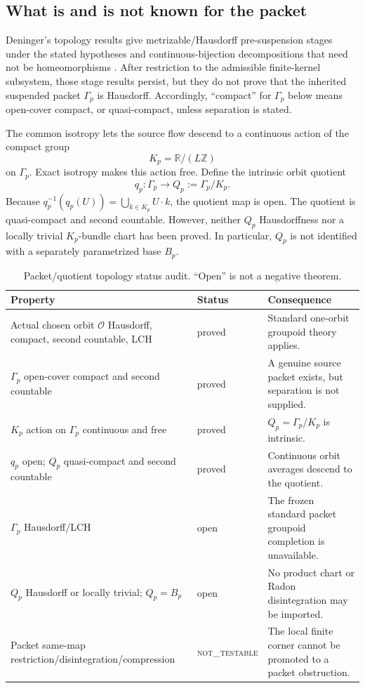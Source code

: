 \documentclass[11pt]{article}
\theoremstyle{definition}
\newcommand{\R}{\mathbb{R}}
\newcommand{\Z}{\mathbb{Z}}
\newcommand{\NOTTESTABLE}{\textsc{not\_testable}}
\begin{document}
\subsection{What is and is not known for the packet}

Deninger's topology results give metrizable/Hausdorff pre-suspension stages under the stated hypotheses and continuous-bijection decompositions that need not be homeomorphisms \cite[Propositions~7.4, 7.6, and~7.7; Corollaries~7.8--7.9; Theorem~7.10 and remarks, arXiv-v4 pp.~43--47]{Deninger2026}.  After restriction to the admissible finite-kernel subsystem, those stage results persist, but they do not prove that the inherited suspended packet \(\Gamma_p\) is Hausdorff.  Accordingly, ``compact'' for \(\Gamma_p\) below means open-cover compact, or quasi-compact, unless separation is stated.

The common isotropy lets the source flow descend to a continuous action of the compact group
\[
 K_p=\R/(L\Z)
\]
on \(\Gamma_p\).  Exact isotropy makes this action free.  Define the intrinsic orbit quotient
\[
 q_p:\Gamma_p\longrightarrow Q_p:=\Gamma_p/K_p.
\]
Because \(q_p^{-1}(q_p(U))=\bigcup_{k\in K_p}U\cdot k\), the quotient map is open.  The quotient is quasi-compact and second countable.  However, neither \(Q_p\) Hausdorffness nor a locally trivial \(K_p\)-bundle chart has been proved.  In particular, \(Q_p\) is not identified with a separately parametrized base \(B_p\).

\begin{table}[htbp]
\centering\small
\caption{Packet/quotient topology status audit.  ``Open'' is not a negative theorem.}\label{tab:packet}
\begin{tabularx}{\textwidth}{P{0.28\textwidth}P{0.22\textwidth}Y}
\toprule
Property & Status & Consequence\\
\midrule
Actual chosen orbit \(\mathcal O\) Hausdorff, compact, second countable, LCH & proved & Standard one-orbit groupoid theory applies.\\
\(\Gamma_p\) open-cover compact and second countable & proved & A genuine source packet exists, but separation is not supplied.\\
\(K_p\) action on \(\Gamma_p\) continuous and free & proved & \(Q_p=\Gamma_p/K_p\) is intrinsic.\\
\(q_p\) open; \(Q_p\) quasi-compact and second countable & proved & Continuous orbit averages descend to the quotient.\\
\(\Gamma_p\) Hausdorff/LCH & open & The frozen standard packet groupoid completion is unavailable.\\
\(Q_p\) Hausdorff or locally trivial; \(Q_p=B_p\) & open & No product chart or Radon disintegration may be imported.\\
Packet same-map restriction/\allowbreak disintegration/\allowbreak compression & \NOTTESTABLE & The local finite corner cannot be promoted to a packet obstruction.\\
\bottomrule
\end{tabularx}
\end{table}
\end{document}
